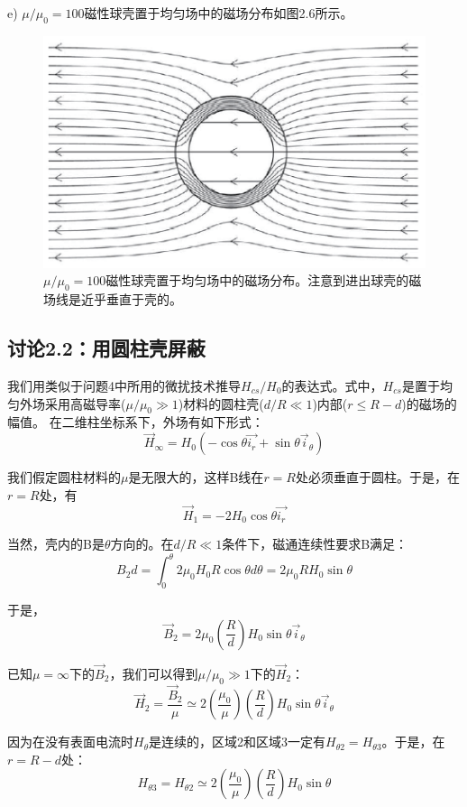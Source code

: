 e) $\mu/\mu_0=100$磁性球壳置于均匀场中的磁场分布如图2.6所示。

\begin{figure}[htbp]
  \centering
 \includegraphics[scale=0.7]{chpt2/figs/fig2.6.eps}
  \caption{$\mu/\mu_0=100$磁性球壳置于均匀场中的磁场分布。注意到进出球壳的磁场线是近乎垂直于壳的。}
\end{figure}



\subsection{讨论2.2：用圆柱壳屏蔽}
我们用类似于问题4中所用的微扰技术推导$H_{cs}/H_0$的表达式。式中，$H_{cs}$是置于均匀外场采用高磁导率($\mu/\mu_0 \gg 1$)材料的圆柱壳($d/R\ll 1$)内部($r\le R-d$)的磁场的幅值。
在二维柱坐标系下，外场有如下形式：
\begin{equation*}
\vec{H}_\infty =H_0 (-\cos\theta \vec{i_r}+\sin\theta\vec{i}_\theta) \tag{2.40}
\end{equation*}


我们假定圆柱材料的$\mu$是无限大的，这样B线在$r=R$处必须垂直于圆柱。于是，在$r=R$处，有
$$\vec{H}_1 =-2 H_0 \cos\theta \vec{i_r}$$

当然，壳内的B是$\theta$方向的。在$d/R\ll 1$条件下，磁通连续性要求B满足：
$$B_2 d=\int_{0}^{\theta}2\mu_0 H_0 R\cos\theta d\theta=2\mu_0 R H_0 \sin\theta$$

于是，
$$\vec{B}_2=2\mu_0 (\frac{R}{d})H_0 \sin\theta \vec{i}_\theta$$

已知$\mu=\infty$下的$\vec{B}_2$，我们可以得到$\mu/\mu_0 \gg 1$下的$\vec{H}_2$：
$$\vec{H}_2= \frac{\vec{B}_2}{\mu}\simeq 2(\frac{\mu_0}{\mu}) (\frac{R}{d})H_0 \sin\theta \vec{i}_\theta$$

因为在没有表面电流时$H_\theta$是连续的，区域2和区域3一定有$H_{\theta 2}=H_{\theta 3}$。于是，在$r=R-d$处：
$$H_{\theta 3}=H_{\theta 2}\simeq 2(\frac{\mu_0}{\mu}) (\frac{R}{d})H_0 \sin\theta$$

